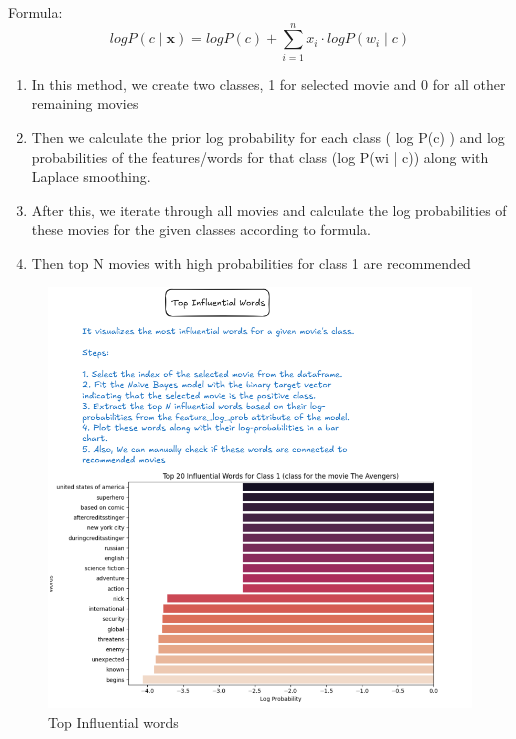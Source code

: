 \documentclass[a4paper]{article}
\theoremstyle{plain}
\begin{document}
Formula:
\[
log P(c \mid \mathbf{x}) = log P(c) + \sum_{i=1}^{n} x_i \cdot log P(w_i \mid c)
\]
\newline
\begin{enumerate}
    \item In this method, we create two classes, 1 for selected movie and 0 for all other remaining movies
    \item  Then we calculate the prior log probability for each class ( log P(c) ) and log probabilities of the features/words for that class (log P(wi | c)) along with Laplace smoothing.
    \item After this, we iterate through all movies and calculate the log probabilities of these movies for the given classes according to formula. 
    \item Then top N movies with high probabilities for class 1 are recommended \end{enumerate}
\begin{figure}
    \centering
    \includegraphics[width=\linewidth]{baytrad2.png}
    \caption{Top Influential words}
    \label{fig:enter-label}
\end{figure}
\end{document}
